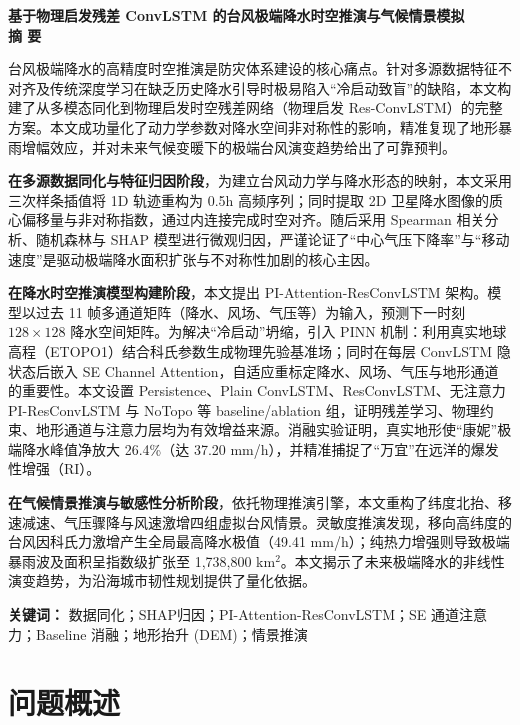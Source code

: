 \documentclass[12pt,a4paper]{ctexart}
\begin{document}
\begin{center}
    \LARGE \textbf{基于物理启发残差 ConvLSTM 的台风极端降水时空推演与气候情景模拟} \\
    \vspace{0.8cm}
    \large \textbf{摘 \quad 要}
\end{center}

\vspace{0.2cm}
台风极端降水的高精度时空推演是防灾体系建设的核心痛点。针对多源数据特征不对齐及传统深度学习在缺乏历史降水引导时极易陷入“冷启动致盲”的缺陷，本文构建了从多模态同化到物理启发时空残差网络（物理启发 Res-ConvLSTM）的完整方案。本文成功量化了动力学参数对降水空间非对称性的影响，精准复现了地形暴雨增幅效应，并对未来气候变暖下的极端台风演变趋势给出了可靠预判。

\textbf{在多源数据同化与特征归因阶段}，为建立台风动力学与降水形态的映射，本文采用三次样条插值将 1D 轨迹重构为 0.5h 高频序列；同时提取 2D 卫星降水图像的质心偏移量与非对称指数，通过内连接完成时空对齐。随后采用 Spearman 相关分析、随机森林与 SHAP 模型进行微观归因，严谨论证了“中心气压下降率”与“移动速度”是驱动极端降水面积扩张与不对称性加剧的核心主因。

\textbf{在降水时空推演模型构建阶段}，本文提出 PI-Attention-ResConvLSTM 架构。模型以过去 11 帧多通道矩阵（降水、风场、气压等）为输入，预测下一时刻 $128 \times 128$ 降水空间矩阵。为解决“冷启动”坍缩，引入 PINN 机制：利用真实地球高程（ETOPO1）结合科氏参数生成物理先验基准场；同时在每层 ConvLSTM 隐状态后嵌入 SE Channel Attention，自适应重标定降水、风场、气压与地形通道的重要性。本文设置 Persistence、Plain ConvLSTM、ResConvLSTM、无注意力 PI-ResConvLSTM 与 NoTopo 等 baseline/ablation 组，证明残差学习、物理约束、地形通道与注意力层均为有效增益来源。消融实验证明，真实地形使“康妮”极端降水峰值净放大 26.4\%（达 37.20 mm/h），并精准捕捉了“万宜”在远洋的爆发性增强（RI）。

\textbf{在气候情景推演与敏感性分析阶段}，依托物理推演引擎，本文重构了纬度北抬、移速减速、气压骤降与风速激增四组虚拟台风情景。灵敏度推演发现，移向高纬度的台风因科氏力激增产生全局最高降水极值（49.41 mm/h）；纯热力增强则导致极端暴雨波及面积呈指数级扩张至 1,738,800 km$^2$。本文揭示了未来极端降水的非线性演变趋势，为沿海城市韧性规划提供了量化依据。

\textbf{关键词：} 数据同化；SHAP归因；PI-Attention-ResConvLSTM；SE 通道注意力；Baseline 消融；地形抬升 (DEM)；情景推演
\newpage
\tableofcontents
\newpage


\section{问题概述}
\end{document}

